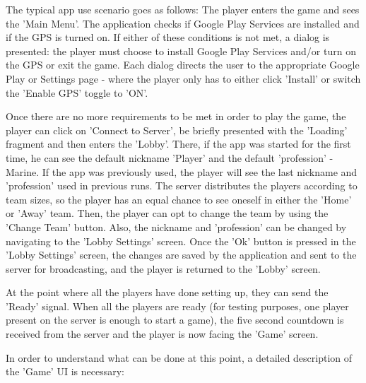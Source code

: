 The typical app use scenario goes as follows: The player enters the game and
sees the 'Main Menu'. The application checks if Google Play Services are
installed and if the GPS is turned on. If either of these conditions is not met,
a dialog is presented: the player must choose to install Google Play Services and/or turn on
the GPS or exit the game. Each dialog directs the user to the appropriate Google
Play or Settings page - where the player only has to either click 'Install' or
switch the 'Enable GPS' toggle to 'ON'.\newline

Once there are no more requirements to be met in order to play the game, the
player can click on 'Connect to Server', be briefly presented with the 'Loading'
fragment and then enters the 'Lobby'. There, if the app was started for the
first time, he can see the default nickname 'Player' and the default
'profession' - Marine. If the app was previously used, the player will see the
last nickname and 'profession' used in previous runs. The server distributes the
players according to team sizes, so the player has an equal chance to see
oneself in either the 'Home' or 'Away' team. Then, the player can opt to change
the team by using the 'Change Team' button. Also, the nickname and 'profession'
can be changed by navigating to the 'Lobby Settings' screen. Once the 'Ok'
button is pressed in the 'Lobby Settings' screen, the changes are saved by the
application and sent to the server for broadcasting, and the player is returned
to the 'Lobby' screen.\newline

At the point where all the players have done setting up, they can send the
'Ready' signal. When all the players are ready (for testing purposes, one
player present on the server is enough to start a game), the five second
countdown is received from the server and the player is now facing the 'Game'
screen.\newline

In order to understand what can be done at this point, a detailed description of
the 'Game' UI is necessary: \newline

